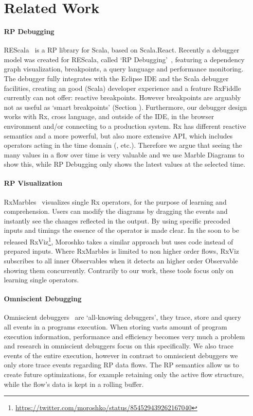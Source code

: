 \section{Related Work}

\paragraph{RP Debugging} 
REScala~\cite{salvaneschi2014rescala} is a RP library for Scala, based on Scala.React. 
Recently a debugger model was created for REScala, called `RP Debugging'~\cite{salvaneschi2016debugging}, 
featuring a dependency graph visualization, breakpoints, a query language and performance monitoring.
The debugger fully integrates with the Eclipse IDE and the Scala debugger facilities, 
creating an good (Scala) developer experience and a feature RxFiddle currently can not offer: reactive breakpoints. 
However breakpoints are arguably not as useful as `smart breakpoints' (Section \label{breakpoints}).
Furthermore, our debugger design works with Rx, cross language, and outside of the IDE,
in the browser environment and/or connecting to a production system.
Rx has different reactive semantics and a more powerful, but also more extensive API, which includes operators acting in the time domain (, etc.).
Therefore we argue that seeing the many values in a flow over time is very valuable and we use Marble Diagrams to show this, 
while RP Debugging only shows the latest values at the selected time.

\paragraph{RP Visualization} 
RxMarbles~\cite{rxmarbles} visualizes single Rx operators, for the purpose of learning and comprehension.
Users can modify the diagrams by dragging the events and instantly see the changes reflected in the output.
By using specific precoded inputs and timings the essence of the operator is made clear.
In the soon to be released RxViz\footnote{\url{https://twitter.com/moroshko/status/854529439262167040}}, 
Moroshko takes a similar approach but uses code instead of prepared inputs.
Where RxMarbles is limited to non higher order flows, RxViz subscribes to all inner Observables when it detects an higher order Observable showing them concurrently.
Contrarily to our work, these tools focus only on learning single operators.

\paragraph{Omniscient Debugging} Omniscient debuggers~\cite{pothier2009back} are `all-knowing debuggers', 
they trace, store and query all events in a programs execution.
When storing vasts amount of program execution information, performance and efficiency becomes very much a problem and research in omniscient debuggers focus on this specifically.
We also trace events of the entire execution, however in contrast to omniscient debuggers we only store trace events regarding RP data flows.
The RP semantics allow us to create future optimizations, for example retaining only the active flow structure, while the flow's data is kept in a rolling buffer.

